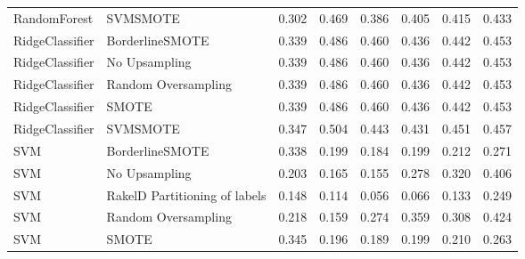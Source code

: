 \begin{tabular}{llllllll}
                   RandomForest &                      SVMSMOTE & 0.302 &                     0.469 &                 0.386 &                  0.405 &                                   0.415 &     0.433 \\
                RidgeClassifier &               BorderlineSMOTE & 0.339 &                     0.486 &                 0.460 &                  0.436 &                                   0.442 &     0.453 \\
                RidgeClassifier &                 No Upsampling & 0.339 &                     0.486 &                 0.460 &                  0.436 &                                   0.442 &     0.453 \\
                RidgeClassifier &           Random Oversampling & 0.339 &                     0.486 &                 0.460 &                  0.436 &                                   0.442 &     0.453 \\
                RidgeClassifier &                         SMOTE & 0.339 &                     0.486 &                 0.460 &                  0.436 &                                   0.442 &     0.453 \\
                RidgeClassifier &                      SVMSMOTE & 0.347 &                     0.504 &                 0.443 &                  0.431 &                                   0.451 &     0.457 \\
                            SVM &               BorderlineSMOTE & 0.338 &                     0.199 &                 0.184 &                  0.199 &                                   0.212 &     0.271 \\
                            SVM &                 No Upsampling & 0.203 &                     0.165 &                 0.155 &                  0.278 &                                   0.320 &     0.406 \\
                            SVM & RakelD Partitioning of labels & 0.148 &                     0.114 &                 0.056 &                  0.066 &                                   0.133 &     0.249 \\
                            SVM &           Random Oversampling & 0.218 &                     0.159 &                 0.274 &                  0.359 &                                   0.308 &     0.424 \\
                            SVM &                         SMOTE & 0.345 &                     0.196 &                 0.189 &                  0.199 &                                   0.210 &     0.263 \\

\end{tabular}
